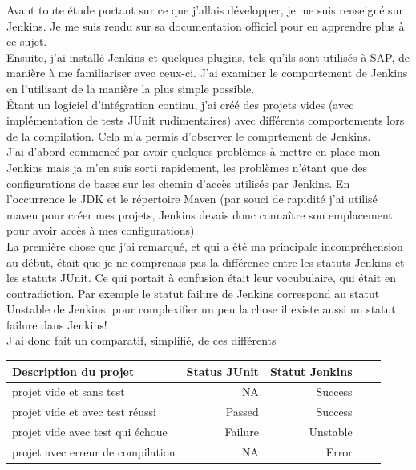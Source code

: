Avant toute étude portant sur ce que j'allais développer, je me suis renseigné sur Jenkins. Je me suis rendu sur sa documentation officiel pour en apprendre plus à ce sujet.\\

Ensuite, j'ai installé Jenkins et quelques plugins, tels qu'ils sont utilisés à SAP, de manière à me familiariser avec ceux-ci. J'ai examiner le comportement de Jenkins en l'utilisant de la manière la plus simple possible.\\

\'{E}tant un logiciel d'intégration continu, j'ai créé des projets vides (avec implémentation de tests JUnit rudimentaires) avec différents comportements lors de la compilation. Cela m'a permis d'observer le comprtement de Jenkins.\\

J'ai d'abord commencé par avoir quelques problèmes à mettre en place mon Jenkins mais ja m'en suis sorti rapidement, les problèmes n'étant que des configurations de bases sur les chemin d'accès utilisés par Jenkins. En l'occurrence le \gls{JDK} et le répertoire Maven (par souci de rapidité j'ai utilisé maven pour créer mes projets, Jenkins devais donc conna\^{i}tre son emplacement pour avoir accès à mes configurations).\\

La première chose que j'ai remarqué, et qui a été ma principale incompréhension au début, était que je ne comprenais pas la différence entre les statuts Jenkins et les statuts JUnit. Ce qui portait à confusion était leur vocubulaire, qui était en contradiction. Par exemple le statut failure de Jenkins correspond au statut Unstable de Jenkins, pour complexifier un peu la chose il existe aussi un statut failure dans Jenkins!\\
J'ai donc fait un comparatif, simplifié, de ces différents

\vspace{0.5cm}

\begin{tabular}{|l|rr|c|c|}
	\hline
  \textbf{Description du projet} 							& \textbf{Status JUnit} 	& \textbf{Statut Jenkins}\\
  \hline
  projet vide et sans test 						& NA 						& Success\\
	
	projet vide et avec test réussi			& Passed				& Success\\
  
  projet vide avec test qui échoue 		& Failure				& Unstable\\
	
  projet avec erreur de compilation 	& NA						& Error\\
  \hline
\end{tabular}

